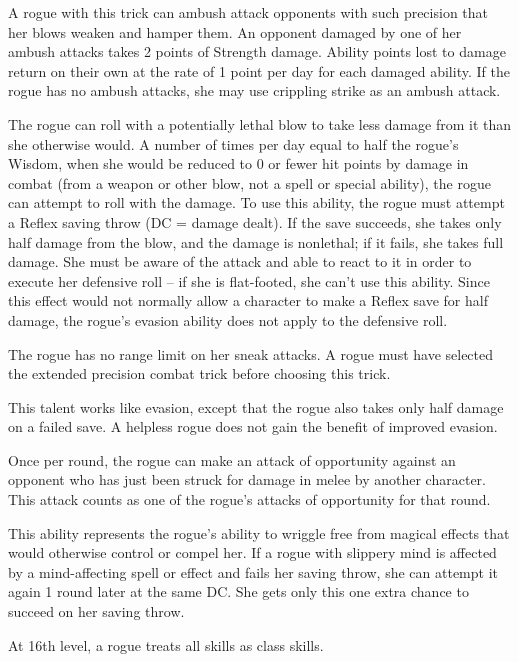  A rogue with this trick can ambush attack opponents with such precision that her blows weaken and hamper them. An opponent damaged by one of her ambush attacks takes 2 points of Strength damage. Ability points lost to damage return on their own at the rate of 1 point per day for each damaged ability. If the rogue has no ambush attacks, she may use crippling strike as an ambush attack.

  The rogue can roll with a potentially lethal blow to take less damage from it than she otherwise would.  A number of times per day equal to half the rogue's Wisdom, when she would be reduced to 0 or fewer hit points by damage in combat (from a weapon or other blow, not a spell or special ability), the rogue can attempt to roll with the damage. To use this ability, the rogue must attempt a Reflex saving throw (DC = damage dealt). If the save succeeds, she takes only half damage from the blow, and the damage is nonlethal; if it fails, she takes full damage. She must be aware of the attack and able to react to it in order to execute her defensive roll -- if she is flat-footed, she can't use this ability. Since this effect would not normally allow a character to make a Reflex save for half damage, the rogue's evasion ability does not apply to the defensive roll.

 The rogue has no range limit on her sneak attacks. A rogue must have selected the extended precision combat trick before choosing this trick.

 This talent works like evasion, except that the rogue also takes only half damage on a failed save. A helpless rogue does not gain the benefit of improved evasion.

  Once per round, the rogue can make an attack of opportunity against an opponent who has just been struck for damage in melee by another character. This attack counts as one of the rogue's attacks of opportunity for that round.

  This ability represents the rogue's ability to wriggle free from magical effects that would otherwise control or compel her. If a rogue with slippery mind is affected by a mind-affecting spell or effect and fails her saving throw, she can attempt it again 1 round later at the same DC. She gets only this one extra chance to succeed on her saving throw.


 At 16th level, a rogue treats all skills as class skills.

